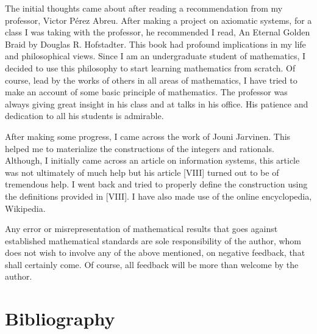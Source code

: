 \documentclass [12pt]{book}
\begin{document}
The initial thoughts came about after reading a recommendation from my professor, Victor P\'erez Abreu. After making a project on axiomatic systems, for a class I was taking with the professor, he recommended I read, An Eternal Golden Braid by Douglas R. Hofstadter. This book had profound implications in my life and philosophical views. Since I am an undergraduate student of mathematics, I decided to use this philosophy to start learning mathematics from scratch. Of course, lead by the works of others in all areas of mathematics, I have tried to make an account of some basic principle of mathematics. The professor was always giving great insight in his class and at talks in his office. His patience and dedication to all his students is admirable.

After making some progress, I came across the work of Jouni J$\ddot{a}$rvinen. This helped me to materialize the constructions of the integers and rationals. Although, I initially came across an article on information systems, this article was not ultimately of much help but his article [VIII] turned out to be of tremendous help. I went back and tried to properly define the construction using the definitions provided in [VIII]. I have also made use of the online encyclopedia, Wikipedia. 

Any error or misrepresentation of mathematical results that goes against established mathematical standards are sole responsibility of the author, whom does not wish to involve any of the above mentioned, on negative feedback, that shall certainly come. Of course, all feedback will be more than welcome by the author.

\section*{Bibliography}
\end{document}
